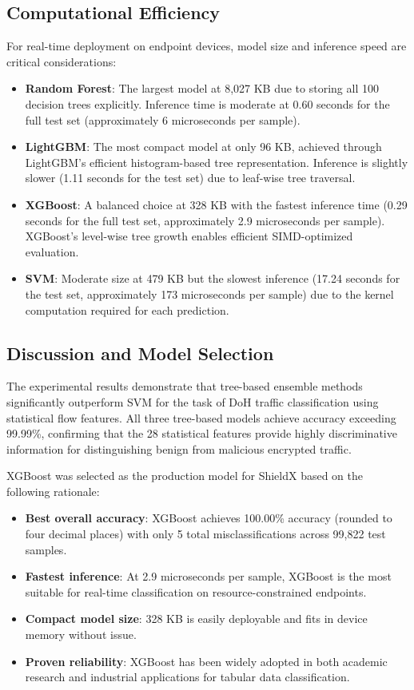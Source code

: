 \documentclass[../Main.tex]{subfiles}
\begin{document}
\subsection{Computational Efficiency}
\label{section:4.6.5}

For real-time deployment on endpoint devices, model size and inference speed are critical considerations:

\begin{itemize}
    \item \textbf{Random Forest}: The largest model at 8,027 KB due to storing all 100 decision trees explicitly. Inference time is moderate at 0.60 seconds for the full test set (approximately 6 microseconds per sample).
    \item \textbf{LightGBM}: The most compact model at only 96 KB, achieved through LightGBM's efficient histogram-based tree representation. Inference is slightly slower (1.11 seconds for the test set) due to leaf-wise tree traversal.
    \item \textbf{XGBoost}: A balanced choice at 328 KB with the fastest inference time (0.29 seconds for the full test set, approximately 2.9 microseconds per sample). XGBoost's level-wise tree growth enables efficient SIMD-optimized evaluation.
    \item \textbf{SVM}: Moderate size at 479 KB but the slowest inference (17.24 seconds for the test set, approximately 173 microseconds per sample) due to the kernel computation required for each prediction.
\end{itemize}

\subsection{Discussion and Model Selection}
\label{section:4.6.6}

The experimental results demonstrate that tree-based ensemble methods significantly outperform SVM for the task of DoH traffic classification using statistical flow features. All three tree-based models achieve accuracy exceeding 99.99\%, confirming that the 28 statistical features provide highly discriminative information for distinguishing benign from malicious encrypted traffic.

XGBoost was selected as the production model for ShieldX based on the following rationale:

\begin{itemize}
    \item \textbf{Best overall accuracy}: XGBoost achieves 100.00\% accuracy (rounded to four decimal places) with only 5 total misclassifications across 99,822 test samples.
    \item \textbf{Fastest inference}: At 2.9 microseconds per sample, XGBoost is the most suitable for real-time classification on resource-constrained endpoints.
    \item \textbf{Compact model size}: 328 KB is easily deployable and fits in device memory without issue.
    \item \textbf{Proven reliability}: XGBoost has been widely adopted in both academic research and industrial applications for tabular data classification.
\end{itemize}
\end{document}
